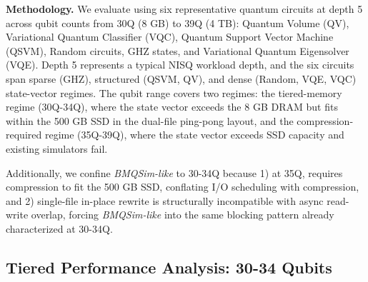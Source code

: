 \noindent\textbf{Methodology.} We evaluate \EdgeQuantum using six representative quantum circuits at depth 5 across qubit counts from 30Q (8 GB) to 39Q (4 TB): Quantum Volume (QV), Variational Quantum Classifier (VQC), Quantum Support Vector Machine (QSVM), Random circuits, GHZ states, and Variational Quantum Eigensolver (VQE). Depth 5 represents a typical NISQ workload depth, and the six circuits span sparse (GHZ), structured (QSVM, QV), and dense (Random, VQE, VQC) state-vector regimes. The qubit range covers two regimes: the tiered-memory regime (30Q-34Q), where the state vector exceeds the 8 GB DRAM but fits within the 500 GB SSD in the dual-file ping-pong layout, and the compression-required regime (35Q-39Q), where the state vector exceeds SSD capacity and existing simulators fail. 

Additionally, we confine \textit{BMQSim-like} to 30-34Q because 1) at 35Q, \EdgeQuantum requires compression to fit the 500 GB SSD, conflating I/O scheduling with compression, and 2) single-file in-place rewrite is structurally incompatible with async read-write overlap, forcing \textit{BMQSim-like} into the same blocking pattern already characterized at 30-34Q.


\subsection{Tiered Performance Analysis: 30-34 Qubits}\label{4.2}


